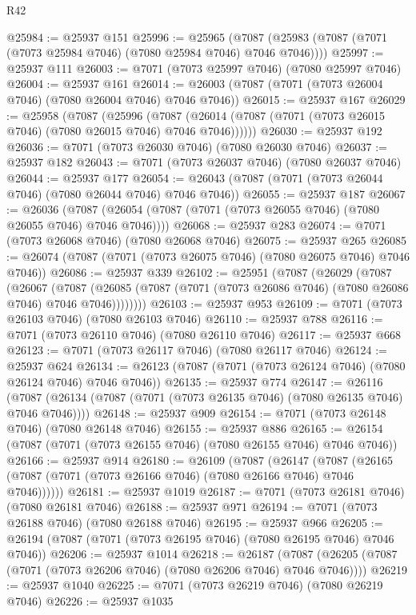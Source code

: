 \begin{lexlean}{R42}
\begin{coremodule}
{@25984 := @25937 @151
@25996 := @25965
    (@7087 (@25983 (@7087 (@7071 (@7073 @25984 @7046) (@7080 @25984 @7046) @7046 @7046))))
@25997 := @25937 @111
@26003 := @7071 (@7073 @25997 @7046) (@7080 @25997 @7046)
@26004 := @25937 @161
@26014 := @26003 (@7087 (@7071 (@7073 @26004 @7046) (@7080 @26004 @7046) @7046 @7046))
@26015 := @25937 @167
@26029 := @25958
    (@7087
      (@25996
        (@7087 (@26014 (@7087 (@7071 (@7073 @26015 @7046) (@7080 @26015 @7046) @7046 @7046))))))
@26030 := @25937 @192
@26036 := @7071 (@7073 @26030 @7046) (@7080 @26030 @7046)
@26037 := @25937 @182
@26043 := @7071 (@7073 @26037 @7046) (@7080 @26037 @7046)
@26044 := @25937 @177
@26054 := @26043 (@7087 (@7071 (@7073 @26044 @7046) (@7080 @26044 @7046) @7046 @7046))
@26055 := @25937 @187
@26067 := @26036
    (@7087 (@26054 (@7087 (@7071 (@7073 @26055 @7046) (@7080 @26055 @7046) @7046 @7046))))
@26068 := @25937 @283
@26074 := @7071 (@7073 @26068 @7046) (@7080 @26068 @7046)
@26075 := @25937 @265
@26085 := @26074 (@7087 (@7071 (@7073 @26075 @7046) (@7080 @26075 @7046) @7046 @7046))
@26086 := @25937 @339
@26102 := @25951
    (@7087
      (@26029
        (@7087
          (@26067
            (@7087
              (@26085 (@7087 (@7071 (@7073 @26086 @7046) (@7080 @26086 @7046) @7046 @7046))))))))
@26103 := @25937 @953
@26109 := @7071 (@7073 @26103 @7046) (@7080 @26103 @7046)
@26110 := @25937 @788
@26116 := @7071 (@7073 @26110 @7046) (@7080 @26110 @7046)
@26117 := @25937 @668
@26123 := @7071 (@7073 @26117 @7046) (@7080 @26117 @7046)
@26124 := @25937 @624
@26134 := @26123 (@7087 (@7071 (@7073 @26124 @7046) (@7080 @26124 @7046) @7046 @7046))
@26135 := @25937 @774
@26147 := @26116
    (@7087 (@26134 (@7087 (@7071 (@7073 @26135 @7046) (@7080 @26135 @7046) @7046 @7046))))
@26148 := @25937 @909
@26154 := @7071 (@7073 @26148 @7046) (@7080 @26148 @7046)
@26155 := @25937 @886
@26165 := @26154 (@7087 (@7071 (@7073 @26155 @7046) (@7080 @26155 @7046) @7046 @7046))
@26166 := @25937 @914
@26180 := @26109
    (@7087
      (@26147
        (@7087 (@26165 (@7087 (@7071 (@7073 @26166 @7046) (@7080 @26166 @7046) @7046 @7046))))))
@26181 := @25937 @1019
@26187 := @7071 (@7073 @26181 @7046) (@7080 @26181 @7046)
@26188 := @25937 @971
@26194 := @7071 (@7073 @26188 @7046) (@7080 @26188 @7046)
@26195 := @25937 @966
@26205 := @26194 (@7087 (@7071 (@7073 @26195 @7046) (@7080 @26195 @7046) @7046 @7046))
@26206 := @25937 @1014
@26218 := @26187
    (@7087 (@26205 (@7087 (@7071 (@7073 @26206 @7046) (@7080 @26206 @7046) @7046 @7046))))
@26219 := @25937 @1040
@26225 := @7071 (@7073 @26219 @7046) (@7080 @26219 @7046)
@26226 := @25937 @1035
}
\end{coremodule}
\end{lexlean}
